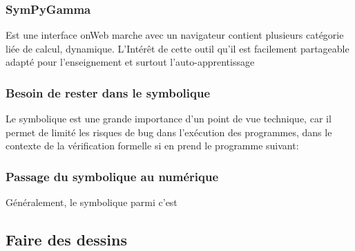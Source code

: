 \subsubsection{SymPyGamma}
Est une interface onWeb marche avec un navigateur contient plusieurs catégorie liée de calcul, dynamique. L’Intérêt de cette outil qu'il est facilement partageable adapté pour l’enseignement et surtout l'auto-apprentissage 
\subsubsection{Besoin de rester dans le symbolique}
Le symbolique est une grande importance d'un point de vue technique, car il permet
de limité les risques de bug dans l'exécution des programmes, dans le contexte de 
la vérification formelle si en prend le programme suivant:

\subsubsection{Passage du symbolique au numérique}
Généralement, le symbolique parmi c'est  
\subsection{Faire des dessins}


